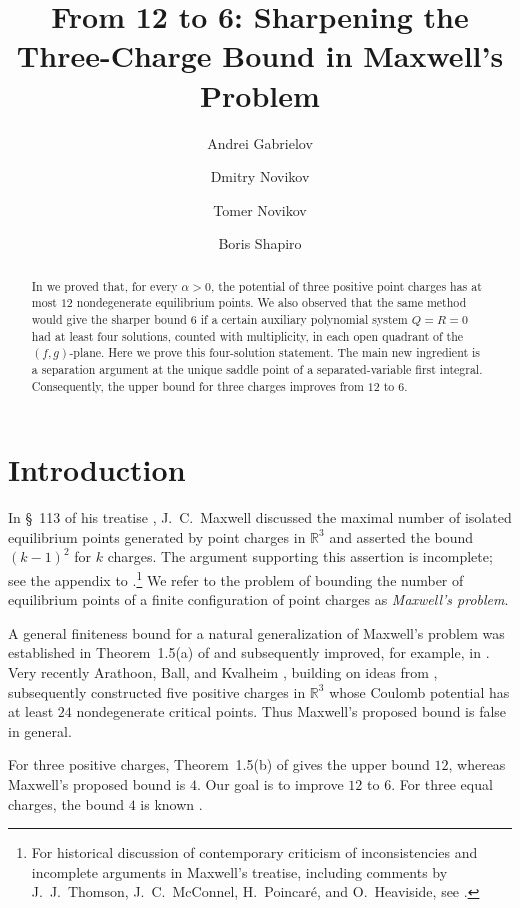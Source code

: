 \documentclass[10pt,reqno]{amsart}
\title[From 12 to 6]{From 12 to 6: Sharpening the Three-Charge Bound in Maxwell's Problem}
\author[A. Gabrielov]{Andrei Gabrielov}
\author[D. Novikov]{Dmitry Novikov}
\author[T. Novikov]{Tomer Novikov}
\author[B. Shapiro]{Boris Shapiro}
\date{}
\numberwithin{equation}{section}
\theoremstyle{plain}
\theoremstyle{remark}
\begin{document}
\begin{abstract}
In \cite{GNS} we proved that, for every $\alpha>0$, the potential of
three positive point charges has at most $12$ nondegenerate equilibrium
points.  We also observed that the same method would give the sharper
bound $6$ if a certain auxiliary polynomial system $Q=R=0$ had at least
four solutions, counted with multiplicity, in each open quadrant of the
$(f,g)$-plane.  Here we prove this four-solution statement.  The main new
ingredient is a separation argument at the unique saddle point of a
separated-variable first integral.  Consequently, the upper bound for three charges improves from $12$ to
$6$.
\end{abstract}

\maketitle

\section{Introduction}\label{sec:introduction}

In \S~113 of his treatise \cite{Ma}, J.~C.~Maxwell discussed the
maximal number of isolated equilibrium points generated by point charges
in $\mathbb R^3$ and asserted the bound $(k-1)^2$ for $k$ charges.  The
argument supporting this assertion is incomplete; see the appendix to
\cite{GNS}.\footnote{For historical discussion of contemporary criticism
of inconsistencies and incomplete arguments in Maxwell's treatise, including
comments by J.~J.~Thomson, J.~C.~McConnel, H.~Poincar\'e, and O.~Heaviside,
see \cite[Chapter~6]{Wa}.} We refer to the problem of bounding the number
of equilibrium points of a finite configuration of point charges as
\emph{Maxwell's problem}.

A general finiteness bound for a natural generalization of Maxwell's problem
was established in Theorem~1.5(a) of \cite{GNS} and subsequently improved,
for example, in \cite{Zo}.  Very recently Arathoon, Ball, and Kvalheim
\cite{ABK}, building on ideas from \cite{Edel}, subsequently constructed five positive
charges in $\mathbb R^3$ whose Coulomb potential has at least $24$
nondegenerate critical points.  Thus Maxwell's proposed bound is false in
general.

For three positive charges, Theorem~1.5(b) of \cite{GNS} gives the upper
bound $12$, whereas Maxwell's proposed bound is $4$.  Our goal is to improve
$12$ to $6$.  For three equal charges, the bound $4$ is known \cite{Ts}.
\end{document}

